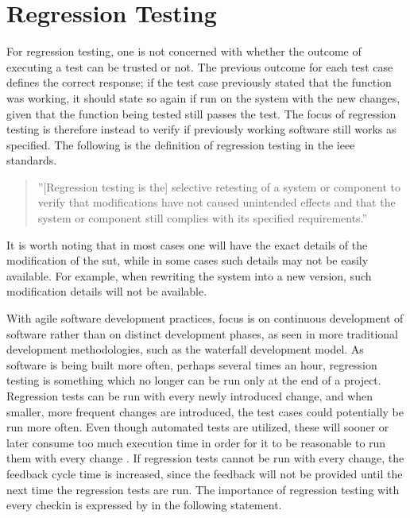 \documentclass[a4paper,english,12pt]{report}
\begin{document}
\section{Regression Testing}
For regression testing, one is not concerned with whether the outcome of executing a test can be trusted or not. The previous outcome for each test case defines the correct response; if the test case previously stated that the function was working, it should state so again if run on the system with the new changes, given that the function being tested still passes the test. The focus of regression testing is therefore instead to verify if previously working software still works as specified. The following is the definition of regression testing in the \gls{ieee} standards. \citep[p. 245]{runeson2012regression}
   
\begin{quote}
''[Regression testing is the] selective retesting of a system or component to verify that modifications have not caused unintended effects and that the system or component still complies with its specified requirements.''
\end{quote}

\noindent It is worth noting that in most cases one will have the exact details of the modification of the \gls{sut}, while in some cases such details may not be easily available. For example, when rewriting the system into a new version, such modification details will not be available. \citep[p. 69]{yoo2012regression}

With agile software development practices, focus is on continuous development of software rather than on distinct development phases, as seen in more traditional development methodologies, such as the waterfall development model. As software is being built more often, perhaps several times an hour, regression testing is something which no longer can be run only at the end of a project. \citep[p. 245]{runeson2012regression} Regression tests can be run with every newly introduced change, and when smaller, more frequent changes are introduced, the test cases could potentially be run more often. Even though automated tests are utilized, these will sooner or later consume too much execution time in order for it to be reasonable to run them with every change \citep[p. 245]{runeson2012regression}. If regression tests cannot be run with every change, the feedback cycle time is increased, since the feedback will not be provided until the next time the regression tests are run. The importance of regression testing with every checkin is expressed by \citet[p. 246]{runeson2012regression} in the following statement.
\end{document}
